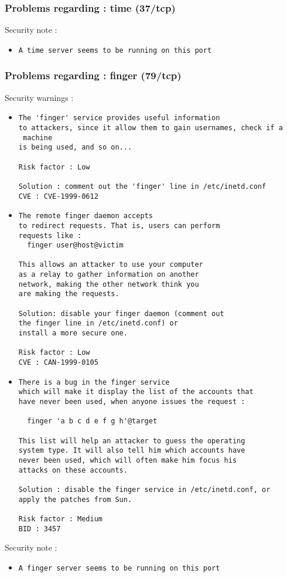 \documentclass{article}
\begin{document}
\subsubsection{Problems regarding : time (37/tcp)}
Security note :\\
\begin{itemize}
\item \begin{verbatim}
A time server seems to be running on this port
\end{verbatim}\end{itemize}
\subsubsection{Problems regarding : finger (79/tcp)}
Security warnings :\\
\begin{itemize}
\item \begin{verbatim}
The 'finger' service provides useful information
to attackers, since it allow them to gain usernames, check if a
 machine
is being used, and so on... 

Risk factor : Low

Solution : comment out the 'finger' line in /etc/inetd.conf
CVE : CVE-1999-0612
\end{verbatim}\item \begin{verbatim}
The remote finger daemon accepts
to redirect requests. That is, users can perform
requests like :
  finger user@host@victim

This allows an attacker to use your computer
as a relay to gather information on another
network, making the other network think you
are making the requests.

Solution: disable your finger daemon (comment out
the finger line in /etc/inetd.conf) or 
install a more secure one.

Risk factor : Low
CVE : CAN-1999-0105
\end{verbatim}\item \begin{verbatim}
There is a bug in the finger service
which will make it display the list of the accounts that
have never been used, when anyone issues the request :

  finger 'a b c d e f g h'@target
  
This list will help an attacker to guess the operating
system type. It will also tell him which accounts have
never been used, which will often make him focus his
attacks on these accounts.

Solution : disable the finger service in /etc/inetd.conf, or
apply the patches from Sun.

Risk factor : Medium
BID : 3457
\end{verbatim}\end{itemize}
Security note :\\
\begin{itemize}
\item \begin{verbatim}
A finger server seems to be running on this port
\end{verbatim}\end{itemize}
\end{document}
